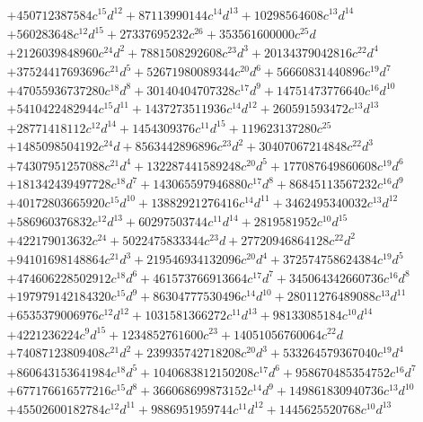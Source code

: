 {\begin{align*}
&+450712387584c^{15}d^{12}+87113990144c^{14}d^{13}+10298564608c^{13}d^{14}\\
&+560283648c^{12}d^{15}+27337695232c^{26}+353561600000c^{25}d\\
&+2126039848960c^{24}d^{2}+7881508292608c^{23}d^{3}+20134379042816c^{22}d^{4}\\
&+37524417693696c^{21}d^{5}+52671980089344c^{20}d^{6}+56660831440896c^{19}d^{7}\\
&+47055936737280c^{18}d^{8}+30140404707328c^{17}d^{9}+14751473776640c^{16}d^{10}\\
&+5410422482944c^{15}d^{11}+1437273511936c^{14}d^{12}+260591593472c^{13}d^{13}\\
&+28771418112c^{12}d^{14}+1454309376c^{11}d^{15}+119623137280c^{25}\\
&+1485098504192c^{24}d+8563442896896c^{23}d^{2}+30407067214848c^{22}d^{3}\\
&+74307951257088c^{21}d^{4}+132287441589248c^{20}d^{5}+177087649860608c^{19}d^{6}\\
&+181342439497728c^{18}d^{7}+143065597946880c^{17}d^{8}+86845113567232c^{16}d^{9}\\
&+40172803665920c^{15}d^{10}+13882921276416c^{14}d^{11}+3462495340032c^{13}d^{12}\\
&+586960376832c^{12}d^{13}+60297503744c^{11}d^{14}+2819581952c^{10}d^{15}\\
&+422179013632c^{24}+5022475833344c^{23}d+27720946864128c^{22}d^{2}\\
&+94101698148864c^{21}d^{3}+219546934132096c^{20}d^{4}+372574758624384c^{19}d^{5}\\
&+474606228502912c^{18}d^{6}+461573766913664c^{17}d^{7}+345064342660736c^{16}d^{8}\\
&+197979142184320c^{15}d^{9}+86304777530496c^{14}d^{10}+28011276489088c^{13}d^{11}\\
&+6535379006976c^{12}d^{12}+1031581366272c^{11}d^{13}+98133085184c^{10}d^{14}\\
&+4221236224c^{9}d^{15}+1234852761600c^{23}+14051056760064c^{22}d\\
&+74087123809408c^{21}d^{2}+239935742718208c^{20}d^{3}+533264579367040c^{19}d^{4}\\
&+860643153641984c^{18}d^{5}+1040683812150208c^{17}d^{6}+958670485354752c^{16}d^{7}\\
&+677176616577216c^{15}d^{8}+366068699873152c^{14}d^{9}+149861830940736c^{13}d^{10}\\
&+45502600182784c^{12}d^{11}+9886951959744c^{11}d^{12}+1445625520768c^{10}d^{13}\\

\end{align*}}
